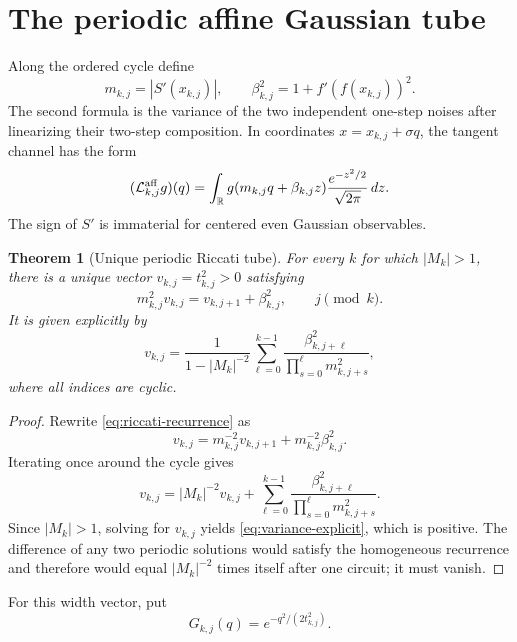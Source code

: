 \documentclass[11pt]{article}
\newtheorem{theorem}{Theorem}[section]
\theoremstyle{definition}
\theoremstyle{remark}
\newcommand{\R}{\mathbb R}
\newcommand{\cL}{\mathcal L}
\begin{document}
\section{The periodic affine Gaussian tube}
\label{sec:riccati}

Along the ordered cycle define
\begin{equation}\label{eq:m-beta}
 m_{k,j}=|S'(x_{k,j})|,
 \qquad
 \beta_{k,j}^2=1+f'(f(x_{k,j}))^2.
\end{equation}
The second formula is the variance of the two independent one-step noises
after linearizing their two-step composition.  In coordinates
$x=x_{k,j}+\sigma q$, the tangent channel has the form
\begin{equation}\label{eq:affine-channel}
 (\cL_{k,j}^{\rm aff}g)(q)
 =\int_\R g(m_{k,j}q+\beta_{k,j}z)
 \frac{e^{-z^2/2}}{\sqrt{2\pi}}\,dz.
\end{equation}
The sign of $S'$ is immaterial for centered even Gaussian observables.

\begin{theorem}[Unique periodic Riccati tube]
\label{thm:periodic-riccati}
For every $k$ for which $|M_k|>1$, there is a unique vector
$v_{k,j}=t_{k,j}^2>0$ satisfying
\begin{equation}\label{eq:riccati-recurrence}
 m_{k,j}^2v_{k,j}=v_{k,j+1}+\beta_{k,j}^2,
 \qquad j\pmod k.
\end{equation}
It is given explicitly by
\begin{equation}\label{eq:variance-explicit}
 v_{k,j}=
 \frac{1}{1-|M_k|^{-2}}
 \sum_{\ell=0}^{k-1}
 \frac{\beta_{k,j+\ell}^2}
 {\prod_{s=0}^{\ell}m_{k,j+s}^2},
\end{equation}
where all indices are cyclic.
\end{theorem}

\begin{proof}
Rewrite \eqref{eq:riccati-recurrence} as
\[
 v_{k,j}=m_{k,j}^{-2}v_{k,j+1}
 +m_{k,j}^{-2}\beta_{k,j}^2.
\]
Iterating once around the cycle gives
\[
 v_{k,j}=|M_k|^{-2}v_{k,j}
 +\sum_{\ell=0}^{k-1}
 \frac{\beta_{k,j+\ell}^2}
 {\prod_{s=0}^{\ell}m_{k,j+s}^2}.
\]
Since $|M_k|>1$, solving for $v_{k,j}$ yields
\eqref{eq:variance-explicit}, which is positive.  The difference of any two
periodic solutions would satisfy the homogeneous recurrence and therefore
would equal $|M_k|^{-2}$ times itself after one circuit; it must vanish.
\end{proof}

For this width vector, put
\begin{equation}\label{eq:gaussian-packets}
 G_{k,j}(q)=e^{-q^2/(2t_{k,j}^2)}.
\end{equation}
\end{document}
